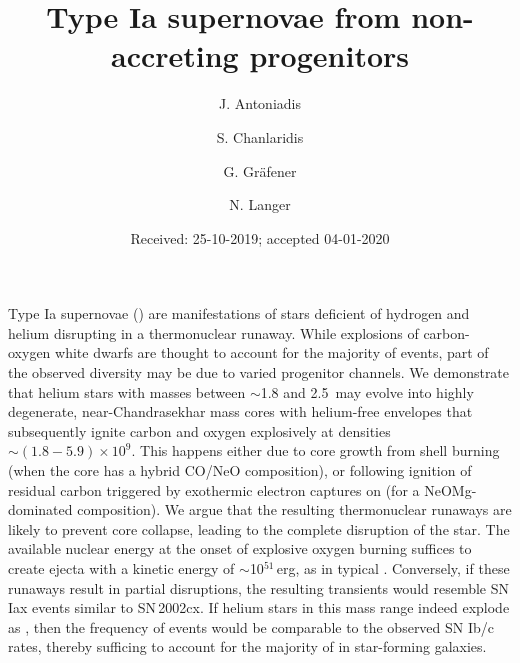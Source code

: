 \documentclass[twocolumn]{aa}
\begin{document}
\title{Type Ia supernovae from non-accreting progenitors}
 


   \author{J. Antoniadis 
   \and S. Chanlaridis 
   \and G. Gr\"{a}fener
   \and N. Langer
          }


   \date{Received: 25-10-2019;  accepted 04-01-2020}





\abstract 
{Type Ia supernovae (\ias) are  manifestations of stars deficient of hydrogen and helium disrupting in a 
thermonuclear runaway. While explosions of carbon-oxygen white dwarfs are 
thought to account for the majority of events, part of the observed diversity 
may be due to varied progenitor channels. We demonstrate that 
helium stars with masses between $\sim$1.8 and 2.5\msun\ may evolve 
into highly degenerate, near-Chandrasekhar mass cores with 
helium-free envelopes that subsequently  ignite carbon and oxygen explosively at densities $\sim(1.8-5.9)\times 10^{9}$\denu. This happens either due to core growth from 
shell burning (when the core has a hybrid CO/NeO composition), 
or following ignition of residual carbon triggered by  
exothermic electron captures on  (for a 
NeOMg-dominated  composition).
 We argue that the resulting 
thermonuclear runaways are likely to prevent core collapse, leading to the complete disruption of the star.
 The available nuclear energy at the onset of 
 explosive oxygen burning suffices to create 
 ejecta with a kinetic energy of $\sim$10$^{51}$\,erg, as in typical \ias. 
 Conversely, if these  runaways  result in partial disruptions, the resulting transients would resemble  
 SN\,Iax events similar to SN\,2002cx. 
If helium stars in this mass range indeed explode as \ias, then the frequency of events would be comparable to the observed SN Ib/c rates, thereby sufficing to account for the majority of \ias in star-forming galaxies.}



\maketitle
\end{document}
